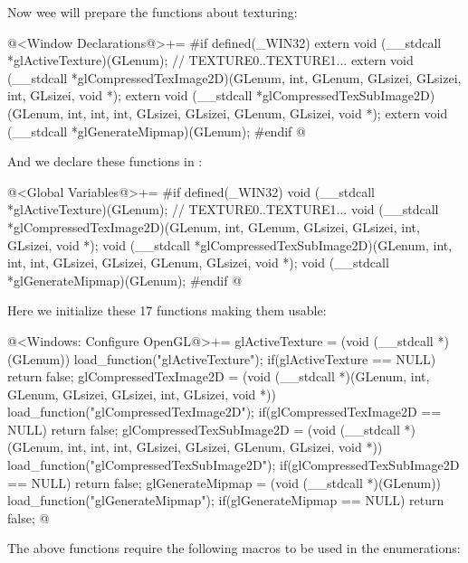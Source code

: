 Now wee will prepare the functions about texturing:

\iniciocodigo
@<Window Declarations@>+=
#if defined(_WIN32)
extern void (__stdcall *glActiveTexture)(GLenum); // TEXTURE0..TEXTURE1...
extern void (__stdcall *glCompressedTexImage2D)(GLenum, int, GLenum, GLsizei,
                                                GLsizei, int, GLsizei, void *);
extern void (__stdcall *glCompressedTexSubImage2D)(GLenum, int, int, int, GLsizei,
                                                   GLsizei, GLenum, GLsizei,
                                                   void *);
extern void (__stdcall *glGenerateMipmap)(GLenum);
#endif
@
\fimcodigo

And we declare these functions in :

\iniciocodigo
@<Global Variables@>+=
#if defined(_WIN32)
void (__stdcall *glActiveTexture)(GLenum); // TEXTURE0..TEXTURE1...
void (__stdcall *glCompressedTexImage2D)(GLenum, int, GLenum, GLsizei,
                                         GLsizei, int, GLsizei, void *);
void (__stdcall *glCompressedTexSubImage2D)(GLenum, int, int, int, GLsizei,
                                            GLsizei, GLenum, GLsizei,
                                            void *);
void (__stdcall *glGenerateMipmap)(GLenum);
#endif
@
\fimcodigo

Here we initialize these 17 functions making them usable:

\iniciocodigo
@<Windows: Configure OpenGL@>+=
glActiveTexture = (void (__stdcall *)(GLenum)) load_function("glActiveTexture");
if(glActiveTexture == NULL) return false;
glCompressedTexImage2D = (void (__stdcall *)(GLenum, int, GLenum, GLsizei,
                            GLsizei, int, GLsizei, void *))
                                  load_function("glCompressedTexImage2D");
if(glCompressedTexImage2D == NULL) return false;
glCompressedTexSubImage2D = (void (__stdcall *)(GLenum, int, int, int, GLsizei,
                              GLsizei, GLenum, GLsizei, void *))
                                   load_function("glCompressedTexSubImage2D");
if(glCompressedTexSubImage2D == NULL) return false;
glGenerateMipmap = (void (__stdcall *)(GLenum)) load_function("glGenerateMipmap");
if(glGenerateMipmap == NULL) return false;
@
\fimcodigo

The above functions require the following macros to be used in the
enumerations:


